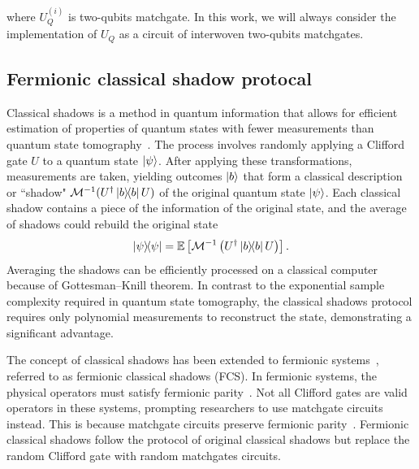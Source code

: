 \documentclass{article}
\begin{document}
where $U_Q^{(i)}$ is two-qubits matchgate. In this work, we will always consider the implementation of $U_Q$ as a circuit of interwoven two-qubits matchgates. 


 
\subsection{Fermionic classical shadow protocal}
Classical shadows is a method in quantum information that allows for efficient estimation of properties of quantum states with fewer measurements than quantum state tomography~\cite{huang2020predicting}. The process involves randomly applying a Clifford gate $U$ to a quantum state $\ket{\psi}$. After applying these transformations, measurements are taken, yielding outcomes $\ket{b}$ that form a classical description or ``shadow" $\mathcal{M}^{-1}(U^\dagger \ketbra{b}{b} U)$ of the original quantum state $\ket{\psi}$. Each classical shadow contains a piece of the information of the original state, and the average of shadows could rebuild the original state~\cite{huang2020predicting}
\begin{equation}
\ketbra{\psi}{\psi}
=\mathbb{E}\left[\mathcal{M}^{-1}\left(U^{\dagger} \ketbra{b}{b} U\right)\right].
\label{eq: mean value of classical shadow}
\end{equation}
Averaging the shadows can be efficiently processed on a classical computer because of Gottesman–Knill theorem. In contrast to the exponential sample complexity required in quantum state tomography, the classical shadows protocol requires only polynomial measurements to reconstruct the state, demonstrating a significant advantage. 


The concept of classical shadows has been extended to fermionic systems~\cite{wan2022matchgate}, referred to as fermionic classical shadows (FCS). In fermionic systems, the physical operators must satisfy fermionic parity~\cite{bravyi2002fermionic, o2018majorana}. Not all Clifford gates are valid operators in these systems, prompting researchers to use matchgate circuits instead. This is because matchgate circuits preserve fermionic parity~\cite{jozsa2008matchgates, hebenstreit2020computational, cai2009theory}.
Fermionic classical shadows follow the protocol of original classical shadows but replace the random Clifford gate with random matchgates circuits.
\end{document}
